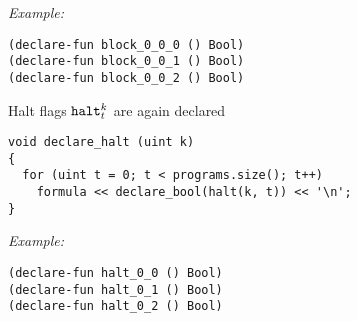 \noindent
\emph{Example:} 

\begin{lstlisting}[style=smtlib]
(declare-fun block_0_0_0 () Bool)
(declare-fun block_0_0_1 () Bool)
(declare-fun block_0_0_2 () Bool)
\end{lstlisting}



\newpage

\noindent
Halt flags $\texttt{halt}^k_t$ are again declared 

\begin{lstlisting}[style=c++]
void declare_halt (uint k)
{
  for (uint t = 0; t < programs.size(); t++)
    formula << declare_bool(halt(k, t)) << '\n';
}
\end{lstlisting}

\noindent
\emph{Example:} 

\begin{lstlisting}[style=smtlib]
(declare-fun halt_0_0 () Bool)
(declare-fun halt_0_1 () Bool)
(declare-fun halt_0_2 () Bool)
\end{lstlisting}





